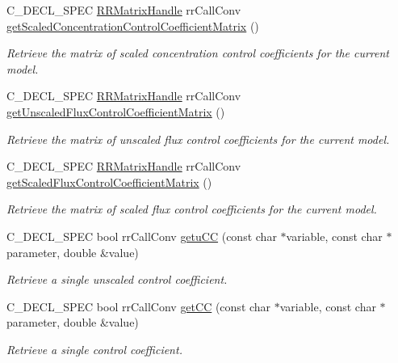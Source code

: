 \begin{DoxyCompactItemize}
\-C\-\_\-\-D\-E\-C\-L\-\_\-\-S\-P\-E\-C \hyperlink{rr__c__types_8h_a87174eefa58ae98dec58c9253ae6c5da}{\-R\-R\-Matrix\-Handle} \*
rr\-Call\-Conv \hyperlink{group__mca_gad28644ca7615c71725056028a0a048ba}{get\-Scaled\-Concentration\-Control\-Coefficient\-Matrix} ()
\begin{DoxyCompactList}\small\item\em \-Retrieve the matrix of scaled concentration control coefficients for the current model. \end{DoxyCompactList}\item 
\-C\-\_\-\-D\-E\-C\-L\-\_\-\-S\-P\-E\-C \hyperlink{rr__c__types_8h_a87174eefa58ae98dec58c9253ae6c5da}{\-R\-R\-Matrix\-Handle} \*
rr\-Call\-Conv \hyperlink{group__mca_ga4b464166bb67773916067bc7e190a338}{get\-Unscaled\-Flux\-Control\-Coefficient\-Matrix} ()
\begin{DoxyCompactList}\small\item\em \-Retrieve the matrix of unscaled flux control coefficients for the current model. \end{DoxyCompactList}\item 
\-C\-\_\-\-D\-E\-C\-L\-\_\-\-S\-P\-E\-C \hyperlink{rr__c__types_8h_a87174eefa58ae98dec58c9253ae6c5da}{\-R\-R\-Matrix\-Handle} \*
rr\-Call\-Conv \hyperlink{group__mca_gad63647a85b299d463b1e4cd5671d0881}{get\-Scaled\-Flux\-Control\-Coefficient\-Matrix} ()
\begin{DoxyCompactList}\small\item\em \-Retrieve the matrix of scaled flux control coefficients for the current model. \end{DoxyCompactList}\item 
\-C\-\_\-\-D\-E\-C\-L\-\_\-\-S\-P\-E\-C bool rr\-Call\-Conv \hyperlink{group__mca_ga6655b7aebdc9e6fad4e7a54e3de9195d}{getu\-C\-C} (const char $\ast$variable, const char $\ast$parameter, double \&value)
\begin{DoxyCompactList}\small\item\em \-Retrieve a single unscaled control coefficient. \end{DoxyCompactList}\item 
\-C\-\_\-\-D\-E\-C\-L\-\_\-\-S\-P\-E\-C bool rr\-Call\-Conv \hyperlink{group__mca_ga49c703842a069c37fa472f2740dd514b}{get\-C\-C} (const char $\ast$variable, const char $\ast$parameter, double \&value)
\begin{DoxyCompactList}\small\item\em \-Retrieve a single control coefficient. \end{DoxyCompactList}\item 

\end{DoxyCompactItemize}
